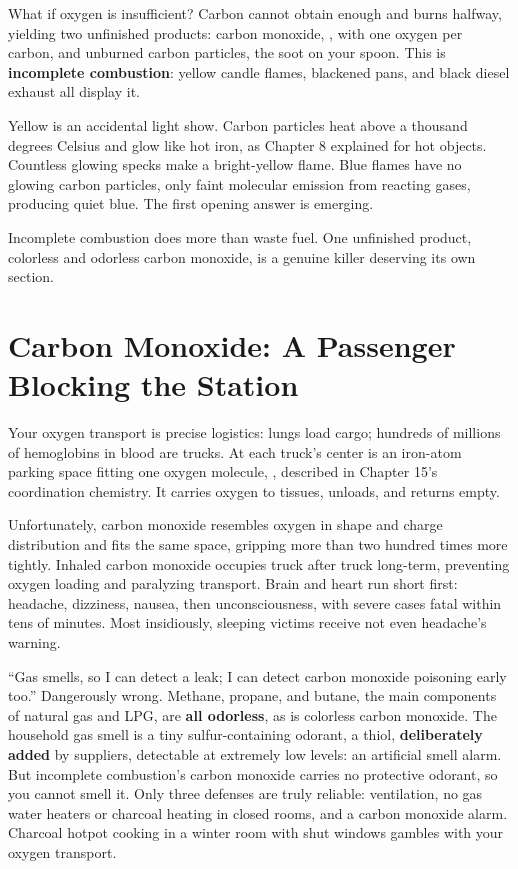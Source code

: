 What if oxygen is insufficient? Carbon cannot obtain enough and burns halfway, yielding two unfinished products: carbon monoxide, , with one oxygen per carbon, and unburned carbon particles, the soot on your spoon. This is \textbf{incomplete combustion}: yellow candle flames, blackened pans, and black diesel exhaust all display it.

Yellow is an accidental light show. Carbon particles heat above a thousand degrees Celsius and glow like hot iron, as Chapter 8 explained for hot objects. Countless glowing specks make a bright-yellow flame. Blue flames have no glowing carbon particles, only faint molecular emission from reacting gases, producing quiet blue. The first opening answer is emerging.

Incomplete combustion does more than waste fuel. One unfinished product, colorless and odorless carbon monoxide, is a genuine killer deserving its own section.

\section{Carbon Monoxide: A Passenger Blocking the Station}

Your oxygen transport is precise logistics: lungs load cargo; hundreds of millions of hemoglobins in blood are trucks. At each truck's center is an iron-atom parking space fitting one oxygen molecule, , described in Chapter 15's coordination chemistry. It carries oxygen to tissues, unloads, and returns empty.

Unfortunately, carbon monoxide resembles oxygen in shape and charge distribution and fits the same space, gripping more than two hundred times more tightly. Inhaled carbon monoxide occupies truck after truck long-term, preventing oxygen loading and paralyzing transport. Brain and heart run short first: headache, dizziness, nausea, then unconsciousness, with severe cases fatal within tens of minutes. Most insidiously, sleeping victims receive not even headache's warning.

\begin{wuqu}
``Gas smells, so I can detect a leak; I can detect carbon monoxide poisoning early too.'' Dangerously wrong. Methane, propane, and butane, the main components of natural gas and LPG, are \textbf{all odorless}, as is colorless carbon monoxide. The household gas smell is a tiny sulfur-containing odorant, a thiol, \textbf{deliberately added} by suppliers, detectable at extremely low levels: an artificial smell alarm. But incomplete combustion's carbon monoxide carries no protective odorant, so you cannot smell it. Only three defenses are truly reliable: ventilation, no gas water heaters or charcoal heating in closed rooms, and a carbon monoxide alarm. Charcoal hotpot cooking in a winter room with shut windows gambles with your oxygen transport.
\end{wuqu}

